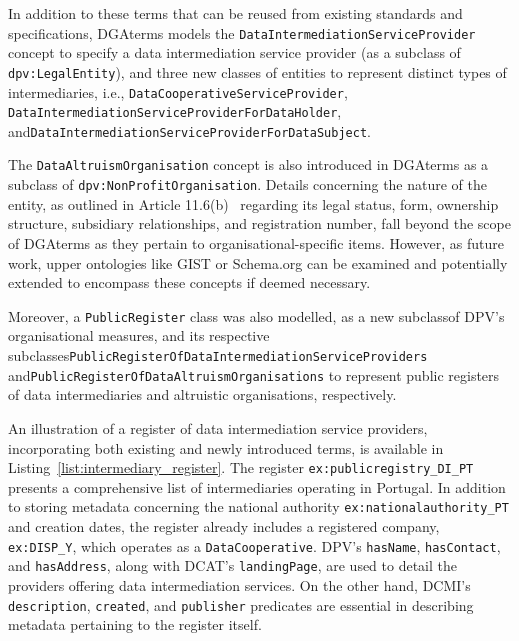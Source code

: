 In addition to these terms that can be reused from existing standards and specifications, DGAterms models the \texttt{DataIntermediationServiceProvider} concept to specify a data intermediation service provider (as a subclass of \texttt{dpv:LegalEntity}), and three new classes of entities to represent distinct types of intermediaries, i.e., \texttt{DataCooperativeServiceProvider}, \texttt{DataIntermediationServiceProviderForDataHolder}, and\linebreak \texttt{DataIntermediationServiceProviderForDataSubject}.

The \texttt{DataAltruismOrganisation} concept is also introduced in DGAterms as a subclass of \texttt{dpv:NonProfitOrganisation}.
Details concerning the nature of the entity, as outlined in Article 11.6(b)~\citeyearpar{noauthor_regulation_2022} regarding its legal status, form, ownership structure, subsidiary relationships, and registration number, fall beyond the scope of DGAterms as they pertain to organisational-specific items.
However, as future work, upper ontologies like GIST \citeyearpar{semantic_arts_gist} or Schema.org \citep{guha_schemaorg_2015} can be examined and potentially extended to encompass these concepts if deemed necessary.

Moreover, a \texttt{PublicRegister} class was also modelled, as a new subclass\linebreak of DPV's organisational measures, and its respective subclasses\linebreak \texttt{PublicRegisterOfDataIntermediationServiceProviders} and\linebreak \texttt{PublicRegisterOfDataAltruismOrganisations} to represent public registers of data intermediaries and altruistic organisations, respectively.

An illustration of a register of data intermediation service providers, incorporating both existing and newly introduced terms, is available in Listing~\ref{list:intermediary_register}.
The register \texttt{ex:publicregistry\_DI\_PT} presents a comprehensive list of intermediaries operating in Portugal.
In addition to storing metadata concerning the national authority \texttt{ex:nationalauthority\_PT} and creation dates, the register already includes a registered company, \texttt{ex:DISP\_Y}, which operates as a \texttt{DataCooperative}.
DPV's \texttt{hasName}, \texttt{hasContact}, and \texttt{hasAddress}, along with DCAT's \texttt{landingPage}, are used to detail the providers offering data intermediation services.
On the other hand, DCMI's \texttt{description}, \texttt{created}, and \texttt{publisher} predicates are essential in describing metadata pertaining to the register itself.

